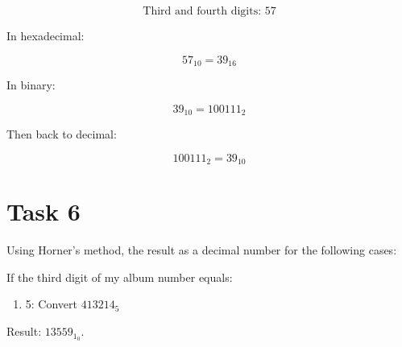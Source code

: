 \documentclass{article}
\begin{document}
\[
\text{Third and fourth digits: } 57
\]

In hexadecimal:

\[
57_{10} = 39_{16}
\]

In binary:

\[
39_{10} = 100111_2
\]

Then back to decimal:

\[
100111_2 = 39_{10}
\]

\section*{Task 6}
Using Horner's method, the result as a decimal number for the following cases:

If the third digit of my album number equals:

\begin{enumerate}
    \item 5: Convert \( 413214_5 \)
\end{enumerate}

Result: \( 13559_1_0 \).
\end{document}
